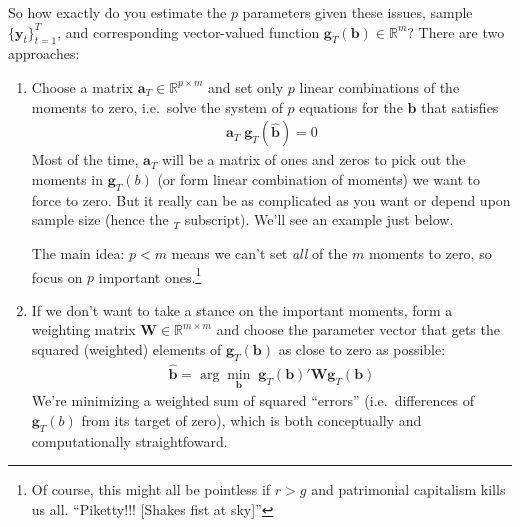 \documentclass[12pt]{article}
\theoremstyle{plain}
\theoremstyle{definition}
\theoremstyle{remark}
\begin{document}
So how exactly do you estimate the $p$ parameters given these issues,
sample $\{\boldsymbol{y}_t\}_{t=1}^T$, and corresponding vector-valued
function $\boldsymbol{g}_T(\boldsymbol{b})\in \mathbb{R}^m$? There are
two approaches:
\begin{enumerate}
  \item Choose a matrix $\boldsymbol{a}_T\in\mathbb{R}^{p\times m}$ and
    set only $p$ linear combinations of the
    moments to zero, i.e.\ solve the system of $p$ equations for the
    $\boldsymbol{\hat{b}}$ that satisfies
    \begin{align}
      \boldsymbol{a}_T
      \;
      \boldsymbol{g}_T(\boldsymbol{\hat{b}}) = 0
      \label{eq:bhatdef}
    \end{align}
    Most of the time, $\boldsymbol{a}_T$ will be a matrix of ones and
    zeros to pick out the moments in $\boldsymbol{g}_T(b)$ (or form
    linear combination of moments) we want to force to zero. But it
    really can be as complicated as you want or depend upon sample size
    (hence the ${}_T$ subscript). We'll see an example just below.

    The main idea: $p<m$ means we can't set \emph{all} of the $m$
    moments to zero, so focus on $p$ important ones.\footnote{Of course,
      this might all be pointless if $r > g$ and patrimonial capitalism
    kills us all. ``Piketty!!! [Shakes fist at sky]''}

  \item If we don't want to take a stance on the important moments, form
    a weighting matrix $\boldsymbol{W}\in \mathbb{R}^{m\times m}$ and
    choose the parameter vector that gets the squared (weighted)
    elements of $\boldsymbol{g}_T(\boldsymbol{b})$ as close to zero as
    possible:
    \begin{align}
      \boldsymbol{\hat{b}} = \arg\min_{\boldsymbol{b}}\;
      \boldsymbol{g}_T(\boldsymbol{b})' \boldsymbol{W}
      \boldsymbol{g}_T(\boldsymbol{b})
      \label{eq:bhatmin}
    \end{align}
    We're minimizing a weighted sum of squared ``errors'' (i.e.\
    differences of $\boldsymbol{g}_T(b)$ from its target of zero), which
    is both conceptually and computationally straightfoward.


\end{enumerate}
\end{document}
